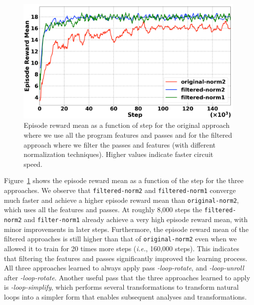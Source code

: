 \begin{figure}[!t]
    \centering
    \includegraphics[width=\linewidth]{Figures/reward2.png}
    \caption{Episode reward mean as a function of step for the original approach where we use all the program features and passes and for the filtered approach where we filter the passes and features (with different normalization techniques). Higher values indicate faster circuit speed.}
    \label{fig:reward}
\end{figure}
Figure~\ref{fig:reward} shows the episode reward mean as a function of the step for the three approaches. We observe that \texttt{filtered-norm2} and \texttt{filtered-norm1} converge much faster and achieve a higher episode reward mean than \texttt{original-norm2}, which uses all the features and passes. At roughly 8,000 steps the \texttt{filtered-norm2} and \texttt{filter-norm1} already achieve a very high episode reward mean, with minor improvements in later steps. Furthermore, the episode reward mean of the filtered approaches is still higher than that of \texttt{original-norm2} even when we allowed it to train for 20 times more steps (\textit{i.e.}, 160,000 steps). This indicates that filtering the features and passes significantly improved the learning process. 
All three approaches learned to always apply pass \textit{-loop-rotate}, and \textit{-loop-unroll} after \textit{-loop-rotate}. Another useful pass that the three approaches learned to apply is \textit{-loop-simplify}, which performs several transformations to transform natural loops into a simpler form that enables subsequent analyses and transformations.


